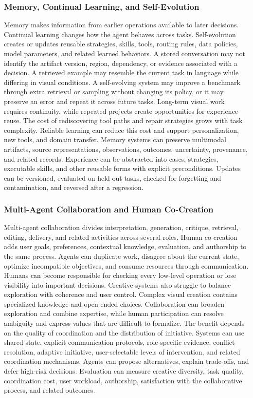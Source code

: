 \subsubsection{Memory, Continual Learning, and Self-Evolution}

Memory makes information from earlier operations available to later decisions. Continual learning changes how the agent behaves across tasks. Self-evolution creates or updates reusable strategies, skills, tools, routing rules, data policies, model parameters, and related learned behaviors. A stored conversation may not identify the artifact version, region, dependency, or evidence associated with a decision. A retrieved example may resemble the current task in language while differing in visual conditions. A self-evolving system may improve a benchmark through extra retrieval or sampling without changing its policy, or it may preserve an error and repeat it across future tasks. Long-term visual work requires continuity, while repeated projects create opportunities for experience reuse. The cost of rediscovering tool paths and repair strategies grows with task complexity. Reliable learning can reduce this cost and support personalization, new tools, and domain transfer. Memory systems can preserve multimodal artifacts, source representations, observations, outcomes, uncertainty, provenance, and related records. Experience can be abstracted into cases, strategies, executable skills, and other reusable forms with explicit preconditions. Updates can be versioned, evaluated on held-out tasks, checked for forgetting and contamination, and reversed after a regression.


\subsubsection{Multi-Agent Collaboration and Human Co-Creation}

Multi-agent collaboration divides interpretation, generation, critique, retrieval, editing, delivery, and related activities across several roles. Human co-creation adds user goals, preferences, contextual knowledge, evaluation, and authorship to the same process. Agents can duplicate work, disagree about the current state, optimize incompatible objectives, and consume resources through communication. Humans can become responsible for checking every low-level operation or lose visibility into important decisions. Creative systems also struggle to balance exploration with coherence and user control. Complex visual creation contains specialized knowledge and open-ended choices. Collaboration can broaden exploration and combine expertise, while human participation can resolve ambiguity and express values that are difficult to formalize. The benefit depends on the quality of coordination and the distribution of initiative. Systems can use shared state, explicit communication protocols, role-specific evidence, conflict resolution, adaptive initiative, user-selectable levels of intervention, and related coordination mechanisms. Agents can propose alternatives, explain trade-offs, and defer high-risk decisions. Evaluation can measure creative diversity, task quality, coordination cost, user workload, authorship, satisfaction with the collaborative process, and related outcomes.



